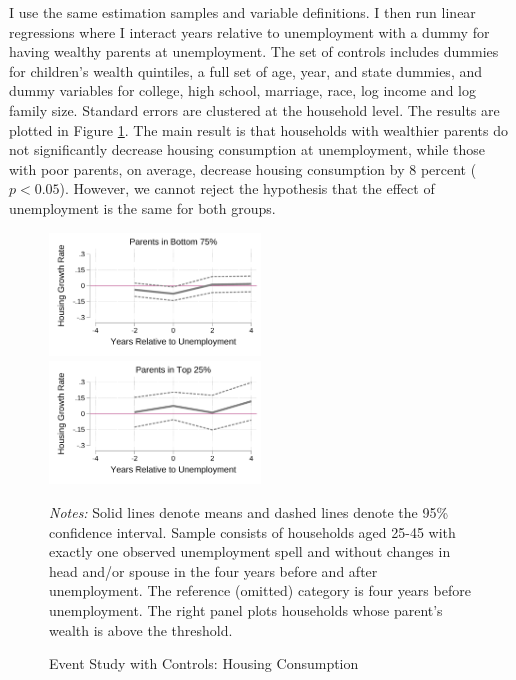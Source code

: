 \documentclass[12pt]{article}
\begin{document}
I use the same estimation samples and variable definitions. I then run linear regressions where I interact years relative to unemployment with a dummy for having wealthy parents at unemployment. The set of controls includes dummies for children's wealth quintiles, a full set of age, year, and state dummies, and dummy variables for college, high school, marriage, race, log income and log family size. Standard errors are clustered at the household level. The results are plotted in Figure \ref{fig:housinggrowthrates_controls}. The main result is that households with wealthier parents do not significantly decrease housing consumption at unemployment, while those with poor parents, on average, decrease housing consumption by 8 percent ($p<0.05$). However, we cannot reject the hypothesis that the effect of unemployment is the same for both groups.
\begin{figure}
	\caption{Event Study with Controls: Housing Consumption}\label{fig:housinggrowthrates_controls}
	\includegraphics[width=0.5\textwidth]{../tabfig/descr/PSID_housinggrowthpoor_both_controls}%
	\includegraphics[width=0.5\textwidth]{../tabfig/descr/PSID_housinggrowthrich_both_controls}
	
	{\begin{footnotesize} \textit{Notes:} Solid lines denote means and dashed lines denote the 95\% confidence interval. Sample consists of households aged 25-45 with exactly one observed unemployment spell and without changes in head and/or spouse in the four years before and after unemployment. The reference (omitted) category is four years before unemployment.  The right panel plots households whose parent's wealth is above the threshold.  \end{footnotesize}}
\end{figure}
\end{document}
